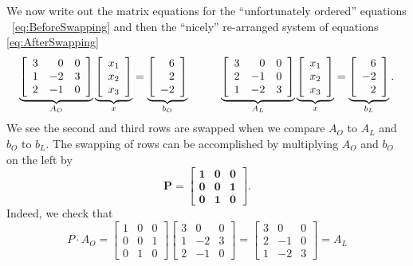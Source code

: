 We now write out the matrix equations for the ``unfortunately ordered'' equations ~\eqref{eq:BeforeSwapping} and then the ``nicely'' re-arranged system of equations \eqref{eq:AfterSwapping}
$$
 \underbrace{\left[\begin{array}{rrr} 3 & 0 & 0\\
1 & -2 & 3 \\ 2 & -1 & 0 \end{array}\right]}_{A_{O}}\underbrace{\left[\begin{array}{c} x_1 \\x_2 \\x_3\end{array} \right]}_{x}
= \underbrace{\left[\begin{array}{r} 6 \\2 \\-2\end{array} \right]}_{b_O} \hspace*{1cm}  \underbrace{\left[\begin{array}{rrr} 3 & 0 & 0\\
 2 & -1 & 0\\ 1 & -2 & 3 \\ \end{array}\right]}_{A_{L}}\underbrace{\left[\begin{array}{c} x_1 \\x_2 \\x_3\end{array} \right]}_{x}
= \underbrace{\left[\begin{array}{r} 6 \\-2 \\2\end{array} \right]}_{b_L}.$$
We see the second and third rows are swapped when we compare $A_O$ to $A_L$ and $b_O$ to $b_L$. 
The swapping of rows can be accomplished by multiplying $A_O$ and $b_O$ on the left by
$$ \mathbf{
P =\left[\begin{array}{rrr} 1 & 0 & 0\\
0 & 0 & 1 \\ 0 & 1 & 0 \end{array}\right]}.$$
Indeed, we check that
$$P \cdot A_O=\left[\begin{array}{rrr} 1 & 0 & 0\\
0 & 0 & 1 \\ 0 & 1 & 0 \end{array}\right] \left[\begin{array}{rrr} 3 & 0 & 0\\
1 & -2 & 3 \\ 2 & -1 & 0 \end{array}\right] = \left[\begin{array}{rrr} 3 & 0 & 0\\
 2 & -1 & 0\\ 1 & -2 & 3  \end{array}\right] = A_L $$
